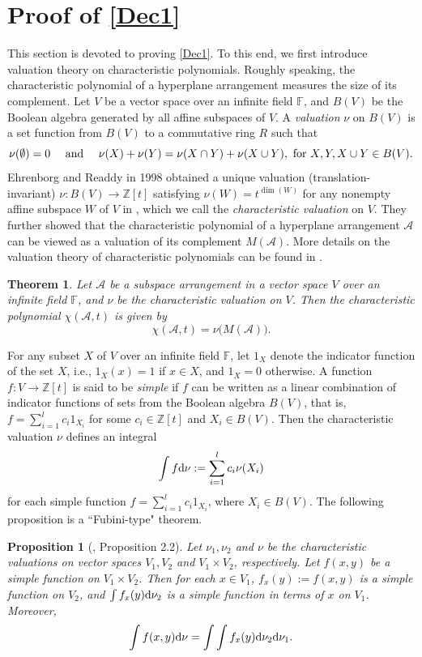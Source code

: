 \documentclass[12pt]{article}%
\numberwithin{equation}{section}
\def\And{\mbox{\rm ~and~}}
\def\For{\mbox{\rm ~for~}}
\newtheorem{theorem}{Theorem}[section]
\newtheorem{proposition}[proposition]{Proposition}
\begin{document}
\section{Proof of \autoref{Dec1}}\label{Sec5}
This section is devoted to proving \autoref{Dec1}. To this end, we first introduce valuation theory on characteristic polynomials. Roughly speaking, the characteristic polynomial of a hyperplane arrangement measures the size of its complement. Let $V$ be a vector space over an infinite field $\mathbb{F}$, and $B(V)$ be the Boolean algebra generated by all affine subspaces of $V$.  A {\em valuation} $\nu$ on $B(V)$ is a set function from $B(V)$ to a commutative ring $R$ such that
\[
\nu(\emptyset)=0\quad\And\quad \nu(X)+\nu(Y)=\nu(X\cap Y)+\nu(X\cup Y), \For X,Y,X\cup Y\in B(V).
\]
Ehrenborg and Readdy in 1998 obtained a unique valuation (translation-invariant) $\nu: B(V)\to \mathbb{Z}[t]$ satisfying $\nu(W)=t^{\dim (W)}$ for any nonempty affine subspace $W$ of $V$ in \cite[Theorem 2.1]{Ehrenborg-Readdy1998},  which we call the {\em characteristic valuation} on $V$. They further showed that the characteristic polynomial of  a hyperplane arrangement $\mathcal{A}$ can be viewed as a valuation of its complement $M(\mathcal{A})$. More details on the valuation theory of characteristic polynomials can be found in \cite{Bjorner1997, Chen2000}.
\begin{theorem}{\rm\cite[Theorem 2.3]{Ehrenborg-Readdy1998}}\label{thm:valuation and characteristic polynomial}
Let $\mathcal{A}$ be a subspace arrangement in a vector space $V$ over an infinite field $\mathbb{F}$, and $\nu$ be the characteristic valuation on $V$. Then the characteristic polynomial $\chi(\mathcal{A},t)$ is given by
\[
\chi(\mathcal{A},t)=\nu\big(M(\mathcal{A})\big).
\]
\end{theorem}

For any subset $X$ of $V$ over an infinite field $\mathbb{F}$,  let $1_X$ denote the indicator function of the set $X$, i.e., $1_X(x)=1$ if $x\in X$, and $1_X=0$ otherwise. A function $f:V\rightarrow\mathbb{Z}[t]$ is said to be {\em simple} if $f$ can be written as a linear combination of indicator functions of sets from the Boolean algebra $B(V)$, that is,  $f=\sum_{i=1}^l c_i 1_{X_i}$ for some $c_i\in\mathbb{Z}[t]$ and  $X_i\in B(V)$.  Then the characteristic valuation $\nu$ defines an integral
\[
\int f{\rm d}\nu := \sum_{i=1}^l c_i \nu({X_i})
\]
for each simple function $f=\sum_{i=1}^l c_i 1_{X_i}$, where $X_i\in B(V)$. The following proposition is a ``Fubini-type" theorem.
\begin{proposition}[\cite{Ehrenborg-Readdy1998}, Proposition 2.2]\label{thm:Fubini-type theorem}
Let $\nu_1,\nu_2$ and $\nu$ be the characteristic valuations on vector spaces $V_1,V_2$ and $V_1\times V_2$, respectively. Let $f(x,y)$ be a
simple function on $V_1\times V_2$. Then for each $x\in V_1$, $f_x(y):=f(x,y)$ is a simple function on $V_2$, and $\int f_x(y){\rm d}\nu_2$
is a simple function in terms of $x$ on $V_1$. Moreover,
\[
\int f(x,y){\rm d}\nu=\int\int f_x(y){\rm d}\nu_2{\rm d}\nu_1.
\]
\end{proposition}
\end{document}
